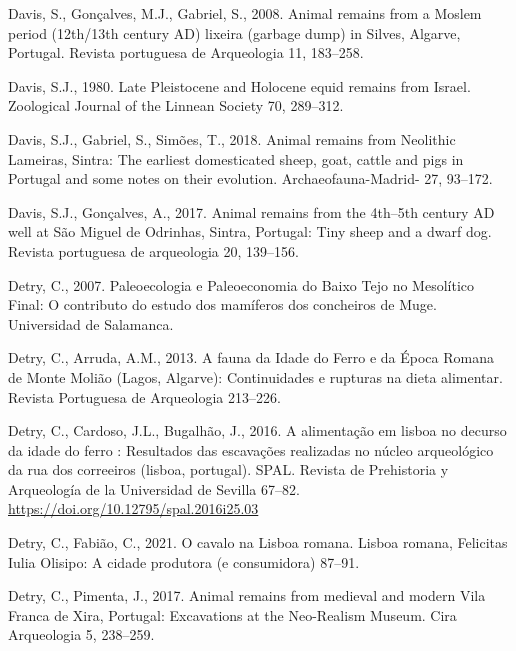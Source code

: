 \documentclass[preprint, 3p, authoryear]{elsarticle} %
\newlength{\cslhangindent}
\newlength{\cslentryspacingunit} %
\newenvironment{CSLReferences}[2] %
 {%
  \setlength{\parindent}{0pt}
  \ifodd #1
  \let\oldpar\par
  \def\par{\hangindent=\cslhangindent\oldpar}
  \fi
  \setlength{\parskip}{#2\cslentryspacingunit}
 }%
 {}
\begin{document}
\begin{CSLReferences}{1}{0}
\leavevmode{}%
Davis, S., Gonçalves, M.J., Gabriel, S., 2008. Animal remains from a {Moslem} period (12th/13th century {AD}) lixeira (garbage dump) in {Silves}, {Algarve}, {Portugal}. Revista portuguesa de Arqueologia 11, 183--258.

\leavevmode{}%
Davis, S.J., 1980. Late {Pleistocene} and {Holocene} equid remains from {Israel}. Zoological Journal of the Linnean Society 70, 289--312.

\leavevmode{}%
Davis, S.J., Gabriel, S., Simões, T., 2018. Animal remains from {Neolithic Lameiras}, {Sintra}: The earliest domesticated sheep, goat, cattle and pigs in {Portugal} and some notes on their evolution. Archaeofauna-Madrid- 27, 93--172.

\leavevmode{}%
Davis, S.J., Gonçalves, A., 2017. Animal remains from the 4th--5th century {AD} well at {São Miguel} de {Odrinhas}, {Sintra}, {Portugal}: Tiny sheep and a dwarf dog. Revista portuguesa de arqueologia 20, 139--156.

\leavevmode{}%
Detry, C., 2007. Paleoecologia e {Paleoeconomia} do {Baixo Tejo} no {Mesolítico Final}: {O} contributo do estudo dos mamíferos dos concheiros de {Muge}. {Universidad de Salamanca}.

\leavevmode{}%
Detry, C., Arruda, A.M., 2013. A fauna da {Idade} do {Ferro} e da {Época Romana} de {Monte Molião} ({Lagos}, {Algarve}): Continuidades e rupturas na dieta alimentar. Revista Portuguesa de Arqueologia 213--226.

\leavevmode{}%
Detry, C., Cardoso, J.L., Bugalhão, J., 2016. A alimentação em lisboa no decurso da idade do ferro : Resultados das escavações realizadas no núcleo arqueológico da rua dos correeiros (lisboa, portugal). SPAL. Revista de Prehistoria y Arqueología de la Universidad de Sevilla 67--82. \url{https://doi.org/10.12795/spal.2016i25.03}

\leavevmode{}%
Detry, C., Fabião, C., 2021. O cavalo na {Lisboa} romana. Lisboa romana, Felicitas Iulia Olisipo: A cidade produtora (e consumidora) 87--91.

\leavevmode{}%
Detry, C., Pimenta, J., 2017. Animal remains from medieval and modern {Vila Franca} de {Xira}, {Portugal}: {Excavations} at the {Neo-Realism Museum}. Cira Arqueologia 5, 238--259.


\end{CSLReferences}
\end{document}
